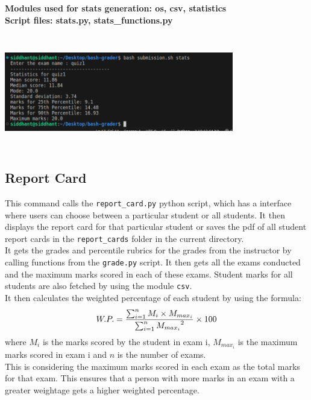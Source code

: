 \documentclass{article}
\begin{document}
\textbf{Modules used for stats generation: os, csv, statistics}\\

\textbf{Script files: stats.py, stats\_functions.py}\\
\begin{center}
    \includegraphics[height=5cm,width=10cm]{stats.png}
\end{center}

\subsection{Report Card}
This command calls the \verb"report_card.py" python script, which has a interface where users can choose between a particular student or all students. It then displays the report card for that particular student or saves the pdf of all student report cards in the \verb"report_cards" folder in the current directory.\\

It gets the grades and percentile rubrics for the grades from the instructor by calling functions from the \verb"grade.py" script. It then gets all the exams conducted and the maximum marks scored in each of these exams. Student marks for all students are also fetched by using the module \verb"csv".\\ It then calculates the weighted percentage of each student by using the formula:
\begin{equation}
    W.P. = \frac{\sum_{i=1}^{n} {M_i} \times {M_{max_i}}}{\sum_{i=1}^{n} {M_{max_i}}^2} \times 100\\
\end{equation}
where $M_i$ is the marks scored by the student in exam i, $M_{max_i}$ is the maximum marks scored in exam i and $n$ is the number of exams.\\

This is considering the maximum marks scored in each exam as the total marks for that exam. This ensures that a person with more marks in an exam with a greater weightage gets a higher weighted percentage.\\
\end{document}
